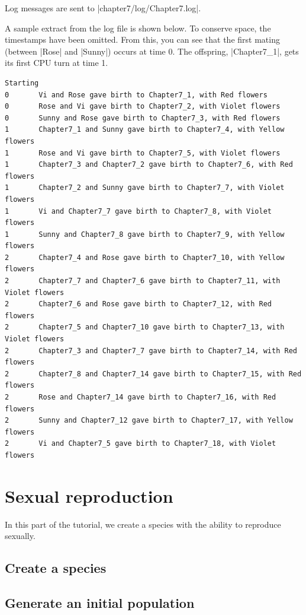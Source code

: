 \documentclass[a4paper,10pt]{report}
\begin{document}
Log messages are sent to |chapter7/log/Chapter7.log|.

A sample extract from the log file is shown below.
To conserve space, the timestamps have been omitted.
From this, you can see that the first mating (between |Rose| and |Sunny|)
occurs at time 0.
The offspring, |Chapter7_1|, gets its first CPU turn at time 1.

\begin{verbatim}
Starting
0       Vi and Rose gave birth to Chapter7_1, with Red flowers
0       Rose and Vi gave birth to Chapter7_2, with Violet flowers
0       Sunny and Rose gave birth to Chapter7_3, with Red flowers
1       Chapter7_1 and Sunny gave birth to Chapter7_4, with Yellow flowers
1       Rose and Vi gave birth to Chapter7_5, with Violet flowers
1       Chapter7_3 and Chapter7_2 gave birth to Chapter7_6, with Red flowers
1       Chapter7_2 and Sunny gave birth to Chapter7_7, with Violet flowers
1       Vi and Chapter7_7 gave birth to Chapter7_8, with Violet flowers
1       Sunny and Chapter7_8 gave birth to Chapter7_9, with Yellow flowers
2       Chapter7_4 and Rose gave birth to Chapter7_10, with Yellow flowers
2       Chapter7_7 and Chapter7_6 gave birth to Chapter7_11, with Violet flowers
2       Chapter7_6 and Rose gave birth to Chapter7_12, with Red flowers
2       Chapter7_5 and Chapter7_10 gave birth to Chapter7_13, with Violet flowers
2       Chapter7_3 and Chapter7_7 gave birth to Chapter7_14, with Red flowers
2       Chapter7_8 and Chapter7_14 gave birth to Chapter7_15, with Red flowers
2       Rose and Chapter7_14 gave birth to Chapter7_16, with Red flowers
2       Sunny and Chapter7_12 gave birth to Chapter7_17, with Yellow flowers
2       Vi and Chapter7_5 gave birth to Chapter7_18, with Violet flowers
\end{verbatim}

\chapter{Sexual reproduction}
\label{sec:bug}

In this part of the tutorial, we create a species with the
ability to reproduce sexually.

\section{Create a species}
\label{sec:species3}



\section{Generate an initial population}
\label{sec:pop3}
\end{document}
